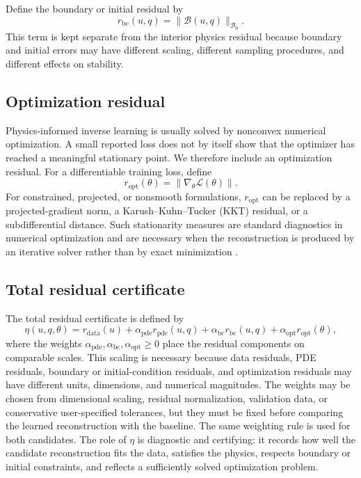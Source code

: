 \documentclass{article}
\numberwithin{equation}{section}
\theoremstyle{definition}
\begin{document}
Define the boundary or initial residual by
\begin{equation}
r_{\mathrm{bc}}(u,q)
=
\|\mathcal B(u,q)\|_{\mathcal B_0}.
\label{eq:boundary-residual}
\end{equation}
This term is kept separate from the interior physics residual because boundary and initial errors may have different scaling, different sampling procedures, and different effects on stability.

\subsection{Optimization residual}

Physics-informed inverse learning is usually solved by nonconvex numerical optimization. A small reported loss does not by itself show that the optimizer has reached a meaningful stationary point. We therefore include an optimization residual. For a differentiable training loss, define
\begin{equation}
r_{\mathrm{opt}}(\theta)
=
\|\nabla_\theta \mathcal L(\theta)\|.
\label{eq:optimization-residual}
\end{equation}
For constrained, projected, or nonsmooth formulations, \(r_{\mathrm{opt}}\) can be replaced by a projected-gradient norm, a Karush--Kuhn--Tucker (KKT) residual, or a subdifferential distance. Such stationarity measures are standard diagnostics in numerical optimization and are necessary when the reconstruction is produced by an iterative solver rather than by exact minimization \cite{NocedalWright2006,Bertsekas1999}.

\subsection{Total residual certificate}

The total residual certificate is defined by
\begin{equation}
\eta(u,q,\theta)
=
r_{\mathrm{data}}(u)
+
\alpha_{\mathrm{pde}} r_{\mathrm{pde}}(u,q)
+
\alpha_{\mathrm{bc}} r_{\mathrm{bc}}(u,q)
+
\alpha_{\mathrm{opt}} r_{\mathrm{opt}}(\theta),
\label{eq:total-certificate}
\end{equation}
where the weights \(\alpha_{\mathrm{pde}},\alpha_{\mathrm{bc}},\alpha_{\mathrm{opt}}\ge0\) place the residual components on comparable scales. This scaling is necessary because data residuals, PDE residuals, boundary or initial-condition residuals, and optimization residuals may have different units, dimensions, and numerical magnitudes. The weights may be chosen from dimensional scaling, residual normalization, validation data, or conservative user-specified tolerances, but they must be fixed before comparing the learned reconstruction with the baseline. The same weighting rule is used for both candidates. The role of \(\eta\) is diagnostic and certifying: it records how well the candidate reconstruction fits the data, satisfies the physics, respects boundary or initial constraints, and reflects a sufficiently solved optimization problem.
\end{document}
